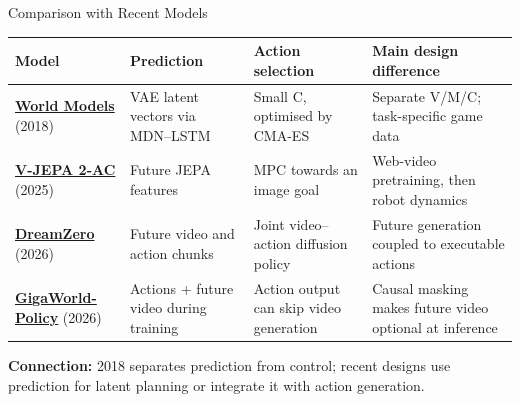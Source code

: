 \documentclass[xcolor=dvipsnames,aspectratio=169]{beamer}
\begin{document}
\begin{frame}{Comparison with Recent Models}
    \small
    \begin{tabularx}{\linewidth}{@{}>{\raggedright\arraybackslash}p{2.7cm} >{\raggedright\arraybackslash}X >{\raggedright\arraybackslash}X >{\raggedright\arraybackslash}X@{}}
        \toprule
        Model & Prediction & Action selection & Main design difference \\
        \midrule
        \href{https://arxiv.org/abs/1803.10122}{\textbf{World Models}} (2018) & VAE latent vectors via MDN--LSTM & Small C, optimised by CMA-ES & Separate V/M/C; task-specific game data \\
        \addlinespace[0.25em]
        \href{https://arxiv.org/abs/2506.09985}{\textbf{V-JEPA 2-AC}} (2025) & Future JEPA features & MPC towards an image goal & Web-video pretraining, then robot dynamics \\
        \addlinespace[0.25em]
        \href{https://arxiv.org/abs/2602.15922}{\textbf{DreamZero}} (2026) & Future video and action chunks & Joint video--action diffusion policy & Future generation coupled to executable actions \\
        \addlinespace[0.25em]
        \href{https://arxiv.org/abs/2603.17240}{\textbf{GigaWorld-Policy}} (2026) & Actions + future video during training & Action output can skip video generation & Causal masking makes future video optional at inference \\
        \bottomrule
    \end{tabularx}
    \par\medskip
    \textbf{Connection:} 2018 separates prediction from control; recent designs
    use prediction for latent planning or integrate it with action generation.
\end{frame}
\end{document}
